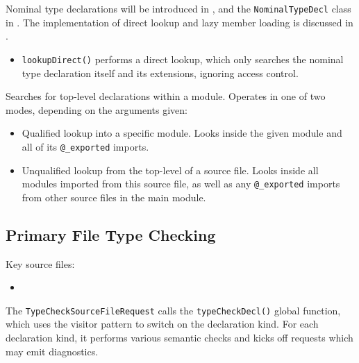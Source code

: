 \documentclass[../generics]{subfiles}
\begin{document}
Nominal type declarations will be introduced in , and the \texttt{NominalTypeDecl} class in . The implementation of direct lookup and lazy member loading is discussed in .
\begin{itemize}
\item \texttt{lookupDirect()} performs a direct lookup, which only searches the nominal type declaration itself and its extensions, ignoring access control.
\end{itemize}

Searches for top-level declarations within a module. Operates in one of two modes, depending on the arguments given:
\begin{itemize}
\item Qualified lookup into a specific module. Looks inside the given module and all of its \verb|@_exported| imports.
\item Unqualified lookup from the top-level of a source file. Looks inside all modules imported from this source file, as well as any \verb|@_exported| imports from other source files in the main module.
\end{itemize}

\subsection*{Primary File Type Checking}
Key source files:
\begin{itemize}
\item {}
\end{itemize}
The \texttt{TypeCheckSourceFileRequest} calls the \texttt{typeCheckDecl()} global function, which uses the visitor pattern to switch on the declaration kind. For each declaration kind, it performs various semantic checks and kicks off requests which may emit diagnostics.
\end{document}
